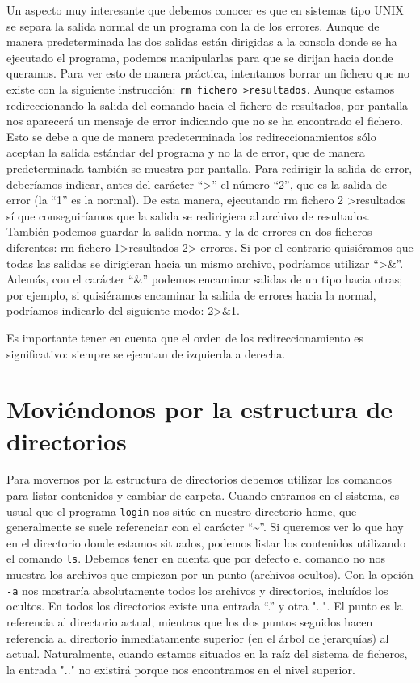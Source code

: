 \documentclass[12pt]{article}
\begin{document}
Un aspecto muy interesante que debemos conocer es que en sistemas tipo UNIX 
se separa la salida normal de un programa con la de los errores. Aunque de  
manera predeterminada las dos salidas están dirigidas a la consola donde 
se ha ejecutado el programa, podemos manipularlas para que se dirijan hacia 
donde queramos. Para ver esto de manera práctica, intentamos borrar un fichero 
que no existe con la siguiente instrucción: \texttt{rm fichero \textgreater resultados}. Aunque 
estamos redireccionando la salida del comando hacia el fichero de resultados, 
por pantalla nos aparecerá un mensaje de error indicando que no se ha encontrado 
el fichero. Esto se debe a que de manera predeterminada los redireccionamientos sólo aceptan 
la salida estándar del programa y no la de error, que de manera predeterminada también se 
muestra por pantalla. Para redirigir la salida de error, deberíamos indicar, 
antes del carácter ``\textgreater'' el número ``2'', que es la salida de error (la ``1'' es la 
normal). De esta manera, ejecutando rm fichero 2 \textgreater resultados sí que conseguiríamos
que la salida se redirigiera al archivo de resultados. También podemos guardar 
la salida normal y la de errores en dos ficheros diferentes: rm fichero 1\textgreater resultados 2\textgreater 
errores. Si por el contrario quisiéramos que todas las salidas se dirigieran
 hacia un mismo archivo, podríamos utilizar ``\textgreater\&''. Además, con el carácter ``\&'' 
podemos encaminar salidas de un tipo hacia otras; por ejemplo, si quisiéramos 
encaminar la salida de errores hacia la normal, podríamos indicarlo del 
siguiente modo: 2\textgreater\&1.

Es importante tener en cuenta que el orden de los redireccionamiento es 
significativo: siempre se ejecutan de izquierda a derecha.

\section{Moviéndonos por la estructura de directorios}

Para movernos por la estructura de directorios debemos utilizar los comandos para 
listar contenidos y cambiar de carpeta. Cuando entramos en el sistema, es usual 
que el programa \texttt{login} nos sitúe en nuestro directorio home, que generalmente se suele 
referenciar con el carácter ``\textasciitilde''. Si queremos ver lo que hay en el 
directorio donde estamos situados, podemos listar los contenidos utilizando el 
comando \texttt{ls}. Debemos tener en cuenta que por defecto el comando no nos muestra los 
archivos que empiezan por un punto (archivos ocultos). Con la opción \texttt{-a} nos mostraría 
absolutamente todos los archivos y directorios, incluídos los ocultos. En todos los directorios existe una entrada 
``.'' y otra "..". El punto es la referencia al directorio actual, mientras 
que los dos puntos seguidos hacen referencia al directorio inmediatamente superior 
(en el árbol de jerarquías) al actual. Naturalmente, cuando estamos situados en 
la raíz del sistema de ficheros, la entrada ".." no existirá porque nos encontramos 
en el nivel superior.
\end{document}

